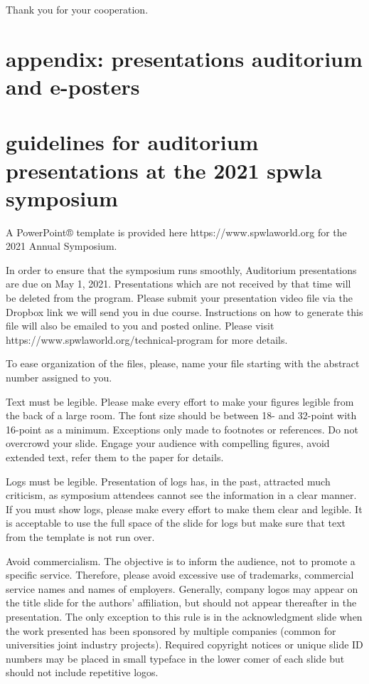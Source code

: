 \documentclass[10pt,twocolumn,twoside]{article}
\begin{document}
Thank you for your cooperation.

\section{appendix: presentations auditorium and e-posters}

\section{guidelines for auditorium presentations at the 2021 spwla symposium}

A PowerPoint® template is provided here https://www.spwlaworld.org for the 2021 Annual Symposium. 

In order to ensure that the symposium runs smoothly, Auditorium presentations are due on May 1, 2021. Presentations which are not received by that time will be deleted from the program. Please submit your presentation video file via the Dropbox link we will send you in due course.  Instructions on how to generate this file will also be emailed to you and posted online.  Please visit https://www.spwlaworld.org/technical-program for more details. 

To ease organization of the files, please, name your file starting with the abstract number assigned to you.

Text must be legible. Please make every effort to make your figures legible from the back of a large room. The font size should be between 18- and 32-point with 16-point as a minimum. Exceptions only made to footnotes or references. Do not overcrowd your slide. Engage your audience with compelling figures, avoid extended text, refer them to the paper for details.

Logs must be legible. Presentation of logs has, in the past, attracted much criticism, as symposium attendees cannot see the information in a clear manner. If you must show logs, please make every effort to make them clear and legible. It is acceptable to use the full space of the slide for logs but make sure that text from the template is not run over.

Avoid commercialism. The objective is to inform the audience, not to promote a specific service. Therefore, please avoid excessive use of trademarks, commercial service names and names of employers. Generally, company logos may appear on the title slide for the authors' affiliation, but should not appear thereafter in the presentation. The only exception to this rule is in the acknowledgment slide when the work presented has been sponsored by multiple companies (common for universities joint industry projects). Required copyright notices or unique slide ID numbers may be placed in small typeface in the lower comer of each slide but should not include repetitive logos.
\end{document}
